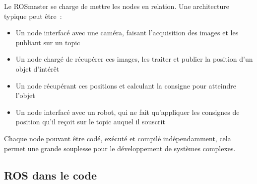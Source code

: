 \documentclass[12pt,a4paper]{article}
\begin{document}
\begin{enumerate}
\begin{itemize}
\end{itemize}
Le ROSmaster se charge de mettre les nodes en relation. Une architecture typique peut être~:
\begin{itemize}
\item Un node interfacé avec une caméra, faisant l'acquisition des images et les publiant sur un topic
\item Un node chargé de récupérer ces images, les traiter et publier la position d'un objet d'intérêt
\item Un node récupérant ces positions et calculant la consigne  pour atteindre l'objet
\item Un node interfacé avec un robot, qui ne fait qu'appliquer les consignes de position qu'il reçoit sur le topic auquel il souscrit
\end{itemize}
Chaque node pouvant être codé, exécuté et compilé indépendamment, cela permet une grande souplesse pour le développement de systèmes complexes.
\end{enumerate}

\subsection{ROS dans le code}
\end{document}
